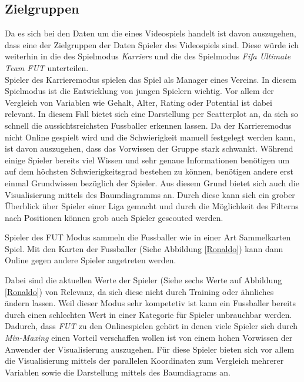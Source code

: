 \documentclass[usegeometry=true]{scrartcl}
\begin{document}
\subsection{Zielgruppen}
Da es sich bei den Daten um die eines Videospiels handelt ist davon auszugehen, dass eine der Zielgruppen der Daten Spieler des Videospiels sind. Diese würde ich weiterhin in die des Spielmodus \textit{Karriere} und die des Spielmodus \textit{Fifa Ultimate Team  FUT} unterteilen.\\

Spieler des Karrieremodus spielen das Spiel als Manager eines Vereins. In diesem Spielmodus ist die Entwicklung von jungen Spielern wichtig. Vor allem der Vergleich von Variablen wie Gehalt, Alter, Rating oder Potential ist dabei relevant. In diesem Fall bietet sich eine Darstellung per Scatterplot an, da sich so schnell die aussichtsreichsten Fussballer erkennen lassen. Da der Karrieremodus nicht Online gespielt wird und die Schwierigkeit manuell festgelegt werden kann, ist davon auszugehen, dass das Vorwissen der Gruppe stark schwankt. Während einige Spieler bereits viel Wissen und sehr genaue Informationen benötigen um auf dem höchsten Schwierigkeitsgrad bestehen zu können, benötigen andere erst einmal Grundwissen bezüglich der Spieler. Aus diesem Grund bietet sich auch die Visualisierung mittels des Baumdiagramms an. Durch diese kann sich ein grober Überblick über Spieler einer Liga gemacht und durch die Möglichkeit des Filterns nach Positionen können grob auch Spieler gescouted werden.

Spieler des FUT Modus sammeln die Fussballer wie in einer Art Sammelkarten Spiel. Mit den Karten der Fussballer (Siehe Abbildung \ref{Ronaldo}) kann dann Online gegen andere Spieler angetreten werden.

 Dabei sind die aktuellen Werte der Spieler (Siehe sechs Werte auf Abbildung \ref{Ronaldo}) von Relevanz, da sich diese nicht durch Training oder ähnliches ändern lassen. Weil dieser Modus sehr kompetetiv ist kann ein Fussballer bereits durch einen schlechten Wert in einer Kategorie für Spieler unbrauchbar werden. Dadurch, dass \textit{FUT} zu den Onlinespielen gehört in denen viele Spieler sich durch \textit{Min-Maxing}\cite{noauthor_min-maxing_2014} einen Vorteil verschaffen wollen ist von einem hohen Vorwissen der Anwender der Visualisierung auszugehen. Für diese Spieler bieten sich vor allem die Visualisierung mittels der parallelen Koordinaten zum Vergleich mehrerer Variablen sowie die Darstellung mittels des Baumdiagrams an. 
\end{document}
